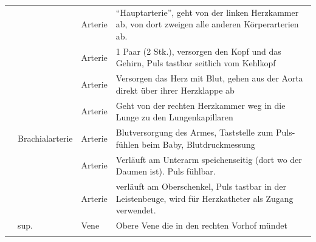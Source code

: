 \begin{gWideParEnv}

{\sffamily
\label{topic:blutgefaesse-wichtige}

\noindent{}

\noindent\begin{tabulary}{\linewidth}{lllL}
\\\addlinespace
\noindent{}
&
\noindent{}
&
\noindent{}
&
\noindent{}
\\\midrule\addlinespace
{} 
&
 
&
Arterie
&
"`Hauptarterie"', geht von der linken Herzkammer ab, von dort zweigen alle
anderen Körperarterien ab.
\\\addlinespace
{} 
&
 
&
Arterie
&
1 Paar (2 Stk.), versorgen den Kopf und das Gehirn, Puls tastbar seitlich vom
Kehlkopf
\\\addlinespace
{} 
&
 
&
Arterie
&
Versorgen das Herz mit Blut, gehen aus der Aorta direkt über ihrer Herzklappe ab
\\\addlinespace
{} 
&
 
&
Arterie
&
\noindent{} Geht von der rechten Herzkammer weg in
die Lunge zu den Lungenkapillaren
\\\addlinespace
{} 
&
Brachialarterie
&
Arterie
&
Blutversorgung des Armes, Taststelle zum Puls-fühlen beim Baby, Blutdruckmessung
\\\addlinespace
{} 
&
 
&
Arterie
&
Verläuft am Unterarm speichenseitig (dort wo der Daumen ist). Puls
fühlbar.
\\\addlinespace
{} 
&
 
&
Arterie
&
verläuft am Oberschenkel, Puls tastbar in der Leistenbeuge, wird für
Herzkatheter als Zugang verwendet. 
\\\addlinespace
{} 
&
 sup. 
&
Vene
&
Obere Vene die in den rechten Vorhof mündet
\\\addlinespace

\end{tabulary}}
\end{gWideParEnv}
